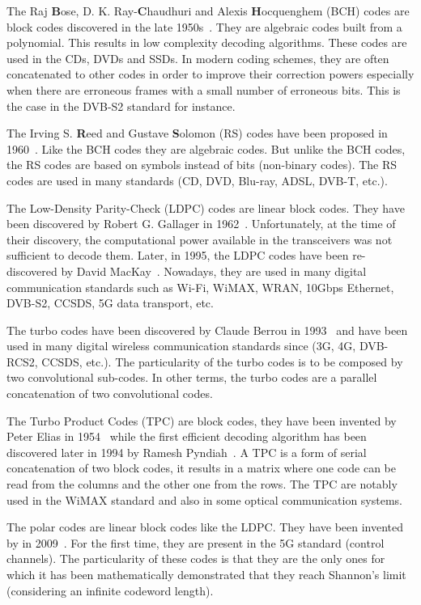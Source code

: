 The Raj \textbf{B}ose, D. K. Ray-\textbf{C}haudhuri and Alexis
\textbf{H}ocquenghem (BCH) codes are block codes discovered in the late
1950s~\cite{Hocquenghem1959,Bose1960}. They are algebraic codes built from a
polynomial. This results in low complexity decoding algorithms. These codes are
used in the CDs, DVDs and SSDs. In modern coding schemes, they are often
concatenated to other codes in order to improve their correction powers
especially when there are erroneous frames with a small number of erroneous
bits. This is the case in the DVB-S2 standard for instance.

The Irving S. \textbf{R}eed and Gustave \textbf{S}olomon (RS) codes have been
proposed in 1960~\cite{Reed1960}. Like the BCH codes they are algebraic codes.
But unlike the BCH codes, the RS codes are based on symbols instead of bits
(non-binary codes). The RS codes are used in many standards (CD, DVD, Blu-ray,
ADSL, DVB-T, etc.).

The Low-Density Parity-Check (LDPC) codes are linear block codes. They have been
discovered by Robert G. Gallager in 1962~\cite{Gallager1962}. Unfortunately, at
the time of their discovery, the computational power available in the
transceivers was not sufficient to decode them. Later, in 1995, the LDPC codes
have been re-discovered by David MacKay~\cite{MacKay1995}. Nowadays, they are
used in many digital communication standards such as Wi-Fi, WiMAX, WRAN, 10Gbps
Ethernet, DVB-S2, CCSDS, 5G data transport, etc.

The turbo codes have been discovered by Claude Berrou in 1993~\cite{Berrou1993}
and have been used in many digital wireless communication standards since (3G,
4G, DVB-RCS2, CCSDS, etc.). The particularity of the turbo codes is to be
composed by two convolutional sub-codes. In other terms, the turbo codes are a
parallel concatenation of two convolutional codes.

The Turbo Product Codes (TPC) are block codes, they have been invented by Peter
Elias in 1954~\cite{Elias1954} while the first efficient decoding algorithm has
been discovered later in 1994 by Ramesh Pyndiah~\cite{Pyndiah1994}. A TPC is a
form of serial concatenation of two block codes, it results in a matrix where
one code can be read from the columns and the other one from the rows. The TPC
are notably used in the WiMAX standard and also in some optical communication
systems.

The polar codes are linear block codes like the LDPC. They have been invented
by \Arikan in 2009~\cite{Arikan2009}. For the first time, they are present in
the 5G standard (control channels). The particularity of these codes is that
they are the only ones for which it has been mathematically demonstrated that
they reach Shannon's limit (considering an infinite codeword length).


